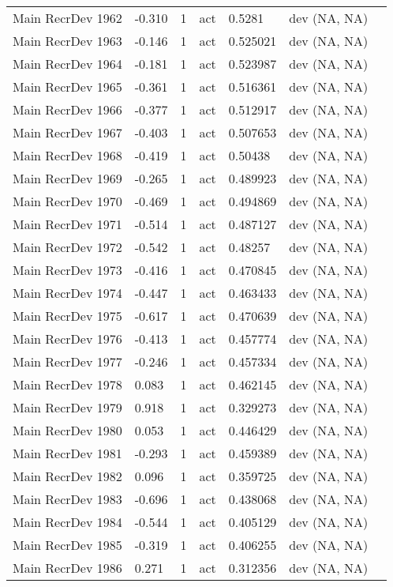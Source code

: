 \documentclass[11pt,
  english,
  a4paper,
]{article}
\begin{document}
\begin{landscape}
\begin{longtable}[t]{>{\raggedright\arraybackslash}p{6cm}lllll>{\raggedright\arraybackslash}p{4cm}}
Main RecrDev 1962 & -0.310 & 1 & act & 0.5281 & dev (NA, NA)\\
Main RecrDev 1963 & -0.146 & 1 & act & 0.525021 & dev (NA, NA)\\
Main RecrDev 1964 & -0.181 & 1 & act & 0.523987 & dev (NA, NA)\\
Main RecrDev 1965 & -0.361 & 1 & act & 0.516361 & dev (NA, NA)\\
Main RecrDev 1966 & -0.377 & 1 & act & 0.512917 & dev (NA, NA)\\
Main RecrDev 1967 & -0.403 & 1 & act & 0.507653 & dev (NA, NA)\\
Main RecrDev 1968 & -0.419 & 1 & act & 0.50438 & dev (NA, NA)\\
Main RecrDev 1969 & -0.265 & 1 & act & 0.489923 & dev (NA, NA)\\
Main RecrDev 1970 & -0.469 & 1 & act & 0.494869 & dev (NA, NA)\\
Main RecrDev 1971 & -0.514 & 1 & act & 0.487127 & dev (NA, NA)\\
Main RecrDev 1972 & -0.542 & 1 & act & 0.48257 & dev (NA, NA)\\
Main RecrDev 1973 & -0.416 & 1 & act & 0.470845 & dev (NA, NA)\\
Main RecrDev 1974 & -0.447 & 1 & act & 0.463433 & dev (NA, NA)\\
Main RecrDev 1975 & -0.617 & 1 & act & 0.470639 & dev (NA, NA)\\
Main RecrDev 1976 & -0.413 & 1 & act & 0.457774 & dev (NA, NA)\\
Main RecrDev 1977 & -0.246 & 1 & act & 0.457334 & dev (NA, NA)\\
Main RecrDev 1978 & 0.083 & 1 & act & 0.462145 & dev (NA, NA)\\
Main RecrDev 1979 & 0.918 & 1 & act & 0.329273 & dev (NA, NA)\\
Main RecrDev 1980 & 0.053 & 1 & act & 0.446429 & dev (NA, NA)\\
Main RecrDev 1981 & -0.293 & 1 & act & 0.459389 & dev (NA, NA)\\
Main RecrDev 1982 & 0.096 & 1 & act & 0.359725 & dev (NA, NA)\\
Main RecrDev 1983 & -0.696 & 1 & act & 0.438068 & dev (NA, NA)\\
Main RecrDev 1984 & -0.544 & 1 & act & 0.405129 & dev (NA, NA)\\
Main RecrDev 1985 & -0.319 & 1 & act & 0.406255 & dev (NA, NA)\\
Main RecrDev 1986 & 0.271 & 1 & act & 0.312356 & dev (NA, NA)\\

\end{longtable}
\end{landscape}
\end{document}
